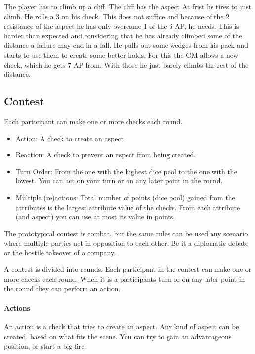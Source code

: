 \documentclass[11pt]{article}
\begin{document}
{\begin{pwexample}
The player has to climb up a cliff. The cliff has the aspect  At frist he tires to just climb. He rolls a 3 on his check. This does not suffice and because of the 2 resistance of the aspect he has only overcome 1 of the 6 AP, he needs. This is harder than expected and considering that he has already climbed some of the distance a failure may end in a fall. He pulls out some wedges from his pack and starts to use them to create some better holds. For this the GM allows a new check, which he gets 7 AP from. With those he just barely climbs the rest of the distance.
\end{pwexample}


\subsection{Contest}
\label{sec:org5803eac}
\begin{short}
Each participant can make one or more checks each round.
\begin{itemize}
\item Action: A check to create an aspect
\item Reaction: A check to prevent an aspect from being created.
\item Turn Order: From the one with the highest dice pool to the one with the lowest. You can act on your turn or on any later point in the round.
\item Multiple (re)actions: Total number of points (dice pool) gained from the attributes is the largest attribute value of the checks. From each attribute (and aspect) you can use at most its value in points.
\end{itemize}
\end{short}

The prototypical contest is combat, but the same rules can be used any scenario where multiple parties act in opposition to each other. Be it a diplomatic debate or the hostile takeover of a company. 

A contest is divided into rounds. Each participant in the contest can make one or more checks each round. When it is a participants turn or on any later point in the round they can perform an action.

\paragraph*{Actions}
\label{sec:org51f2ff8}
An action is a check that tries to create an aspect. Any kind of aspect can be created, based on what fits the scene. You can try to gain an advantageous position, or start a big fire.

}
\end{document}
